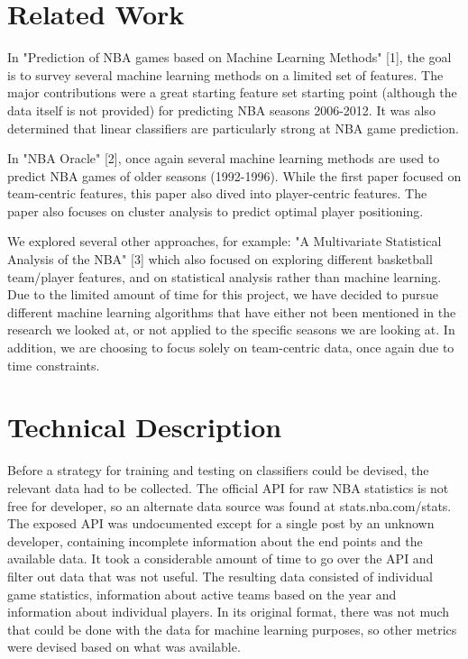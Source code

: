 \documentclass{article}
\begin{document}
\section{Related Work}

In "Prediction of NBA games based on Machine Learning Methods" [1], the goal is to survey several machine learning methods on a limited set of features. The major contributions were a great starting feature set starting point (although the data itself is not provided) for predicting NBA seasons 2006-2012. It was also determined that linear classifiers are particularly strong at NBA game prediction.

In "NBA Oracle" [2], once again several machine learning methods are used to predict NBA games of older seasons (1992-1996). While the first paper focused on team-centric features, this paper also dived into player-centric features. The paper also focuses on cluster analysis to predict optimal player positioning.

We explored several other approaches, for example: "A Multivariate Statistical Analysis of the NBA" [3] which also focused on exploring different basketball team/player features, and on statistical analysis rather than machine learning. Due to the limited amount of time for this project, we have decided to pursue different machine learning algorithms that have either not been mentioned in the research we looked at, or not applied to the specific seasons we are looking at. In addition, we are choosing to focus solely on team-centric data, once again due to time constraints.

\section{Technical Description}

Before a strategy for training and testing on classifiers could be devised, the relevant data had to be collected. The official API for raw NBA statistics is not free for developer, so an alternate data source was found at stats.nba.com/stats. The exposed API was undocumented except for a single post by an unknown developer, containing incomplete information about the end points and the available data. It took a considerable amount of time to go over the API and filter out data that was not useful. The resulting data consisted of individual game statistics, information about active teams based on the year and information about individual players. In its original format, there was not much that could be done with the data for machine learning purposes, so other metrics were devised based on what was available.
\end{document}
